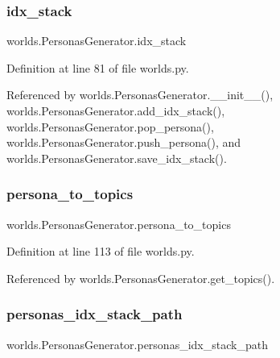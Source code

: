 \subsubsection{\texorpdfstring{idx\+\_\+stack}{idx\_stack}}
{\footnotesize\ttfamily worlds.\+Personas\+Generator.\+idx\+\_\+stack}



Definition at line 81 of file worlds.\+py.



Referenced by worlds.\+Personas\+Generator.\+\_\+\+\_\+init\+\_\+\+\_\+(), worlds.\+Personas\+Generator.\+add\+\_\+idx\+\_\+stack(), worlds.\+Personas\+Generator.\+pop\+\_\+persona(), worlds.\+Personas\+Generator.\+push\+\_\+persona(), and worlds.\+Personas\+Generator.\+save\+\_\+idx\+\_\+stack().

\mbox{\label{classworlds_1_1PersonasGenerator_affd5c6a265862a72c456570297f77466}} 
\subsubsection{\texorpdfstring{persona\+\_\+to\+\_\+topics}{persona\_to\_topics}}
{\footnotesize\ttfamily worlds.\+Personas\+Generator.\+persona\+\_\+to\+\_\+topics}



Definition at line 113 of file worlds.\+py.



Referenced by worlds.\+Personas\+Generator.\+get\+\_\+topics().

\mbox{\label{classworlds_1_1PersonasGenerator_a2e324c3d90bad7cd4d69aece753bcf1a}} 
\subsubsection{\texorpdfstring{personas\+\_\+idx\+\_\+stack\+\_\+path}{personas\_idx\_stack\_path}}
{\footnotesize\ttfamily worlds.\+Personas\+Generator.\+personas\+\_\+idx\+\_\+stack\+\_\+path}



